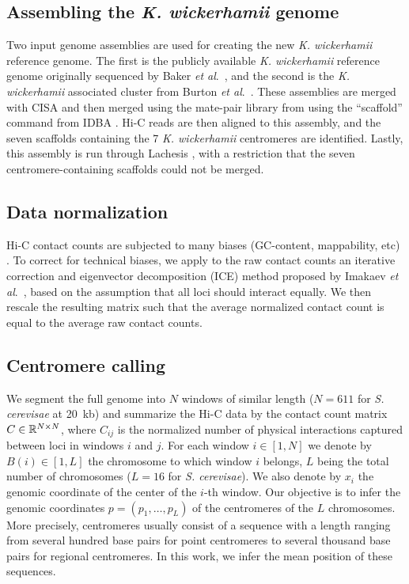 \subsection{Assembling the \textit{K. wickerhamii} genome}

Two input genome assemblies are used for creating the new \textit{K.
wickerhamii}
reference genome. The first is the publicly available \textit{K. wickerhamii} reference
genome originally sequenced by Baker \textit{et al}.~\cite{baker:extensive},
and the
second is the \textit{K. wickerhamii} associated cluster from
Burton \textit{et al}.~\cite{burton:species-level}. These assemblies are merged with CISA
\citep{lin:cisa} and then
merged using the mate-pair library from \citep{burton:species-level} using the
``scaffold'' command from IDBA \citep{peng:IDBA}. Hi-C reads are then aligned to
this assembly, and the seven scaffolds containing the 7 \textit{K. wickerhamii}
centromeres are identified. Lastly, this assembly is run through Lachesis
\citep{burton:chromosome}, with a restriction that the seven
centromere-containing scaffolds could not be merged.

\subsection{Data normalization}

Hi-C contact counts are subjected to many biases (GC-content, mappability,
etc) \citep{yaffe:probabilistic}. To correct for technical biases, we apply 
to the raw contact counts an iterative correction and eigenvector decomposition
(ICE) method proposed by Imakaev \textit{et al}.~\cite{imakaev:iterative},
based on the assumption
that all loci should interact equally. We then rescale the resulting matrix
such that the average normalized contact count is equal to the average raw
contact counts.

\subsection{Centromere calling}

We segment the full genome into $N$ windows of similar length ($N=611$ for
\textit{S. cerevisae} at 20~kb) and summarize the Hi-C data by the contact
count matrix $C\in\mathbb{R}^{N \times N}$, where $C_{ij}$ is the normalized number
of physical interactions captured between loci in windows $i$ and $j$. 
For each window $i\in[1,N]$
we denote by $B(i) \in [1,L]$ the chromosome to which window $i$ belongs,
$L$ being the total number of chromosomes ($L=16$
for \textit{S. cerevisae}). We also denote by $x_i$ the genomic coordinate of
the center of the $i$-th window. Our objective is to infer the genomic
coordinates $p=(p_1, \ldots, p_L)$ of the centromeres of the $L$ chromosomes.
More precisely, centromeres usually consist of a sequence with a length ranging from several hundred
base pairs
for point centromeres to several thousand base pairs for regional centromeres.
In this work, we infer the mean position of these sequences.

